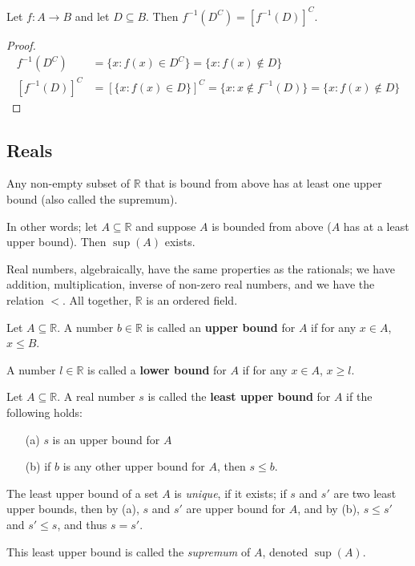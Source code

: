 \documentclass[12pt]{article}
\begin{document}
\begin{proposition}
  Let $f: A\to B$ and let $D \subseteq B$. Then $f^{-1} (D^C) = [f^{-1}(D)]^C$.
\end{proposition}
\begin{proof}
  \begin{align*}
    f^{-1}(D^C) &= \{x: f(x) \in D^C\} = \{x : f(x) \notin D\}\\
    [f^{-1}(D)]^C &= [\{x:f(x) \in D\}]^C = \{x : x \notin f^{-1}(D)\} = \{x : f(x) \notin D\}
  \end{align*}
\end{proof}

\subsection{Reals}
\begin{axiom}[Of Completeness]\label{axiom:ac}
  Any non-empty subset of $\mathbb{R}$ that is bound from above has at least one upper bound (also called the supremum).

  In other words; let $A \subseteq \mathbb{R}$ and suppose $A$ is bounded from above ($A$ has at a least upper bound). Then $\sup(A)$ exists.
\end{axiom}

Real numbers, algebraically, have the same properties as the rationals; we have addition, multiplication, inverse of non-zero real numbers, and we have the relation $<$. All together, $\mathbb{R}$ is an ordered field. 

\begin{definition}
  Let $A \subseteq \mathbb{R}$. A number $b \in \mathbb{R}$ is called an \textbf{upper bound} for $A$ if for any $x \in A$, $x \leq B$.

  A number $l \in \mathbb{R}$ is called a \textbf{lower bound} for $A$ if for any $x \in A$, $x \geq l$.
\end{definition}

\begin{definition}
  Let $A \subseteq \mathbb{R}$. A real number $s$ is called the \textbf{least upper bound} for $A$ if the following holds:
  \begin{itemize}
    \item[(a)] $s$ is an upper bound for $A$
    \item[(b)] if $b$ is any other upper bound for $A$, then $s \leq b$.
  \end{itemize}

  The least upper bound of a set $A$ is \emph{unique}, if it exists; if $s$ and $s'$ are two least upper bounds, then by (a), $s$ and $s'$ are upper bound for $A$, and by (b), $s \leq s'$ and $s' \leq s$, and thus $s = s'$.

  This least upper bound is called the \emph{supremum} of $A$, denoted $\sup(A)$.
\end{definition}
\end{document}
